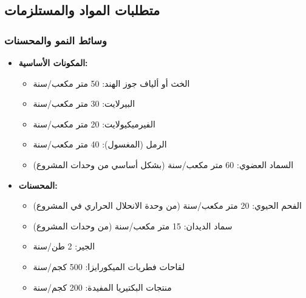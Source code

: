 \subsection{متطلبات المواد والمستلزمات}

\subsubsection{وسائط النمو والمحسنات}
\begin{itemize}
    \item \textbf{المكونات الأساسية:}
    \begin{itemize}
        \item الخث أو ألياف جوز الهند: 50 متر مكعب/سنة
        \item البيرلايت: 30 متر مكعب/سنة
        \item الفيرميكيولايت: 20 متر مكعب/سنة
        \item الرمل (المغسول): 40 متر مكعب/سنة
        \item السماد العضوي: 60 متر مكعب/سنة (بشكل أساسي من وحدات المشروع)
    \end{itemize}
    
    \item \textbf{المحسنات:}
    \begin{itemize}
        \item الفحم الحيوي: 20 متر مكعب/سنة (من وحدة الانحلال الحراري في المشروع)
        \item سماد الديدان: 15 متر مكعب/سنة (من وحدات المشروع)
        \item الجير: 2 طن/سنة
        \item لقاحات فطريات الميكورايزا: 500 كجم/سنة
        \item منتجات البكتيريا المفيدة: 200 كجم/سنة
    \end{itemize}
\end{itemize}

